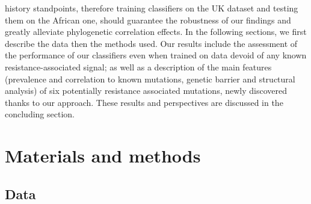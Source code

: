 \documentclass[
  11pt,
  twoside]{scrbook}
\begin{document}
history standpoints, therefore training classifiers on the UK dataset
and testing them on the African one, should guarantee the robustness of
our findings and greatly alleviate phylogenetic correlation effects. In
the following sections, we first describe the data then the methods
used. Our results include the assessment of the performance of our
classifiers even when trained on data devoid of any known
resistance-associated signal; as well as a description of the main
features (prevalence and correlation to known mutations, genetic barrier
and structural analysis) of six potentially resistance associated
mutations, newly discovered thanks to our approach. These results and
perspectives are discussed in the concluding section.

\hypertarget{materials-and-methods}{%
\section{Materials and methods}\label{materials-and-methods}}

\hypertarget{data}{%
\subsection{Data}\label{data}}
\end{document}
